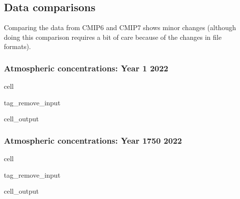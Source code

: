\documentclass[letterpaper,10pt,english]{jupyterBook}
\begin{document}
\subsection{Data comparisons}
\label{\detokenize{user-guide-historical:data-comparisons}}
\sphinxAtStartPar
Comparing the data from CMIP6 and CMIP7 shows minor changes
(although doing this comparison requires a bit of care
because of the changes in file formats).


\subsubsection{Atmospheric concentrations: Year 1 \sphinxhyphen{} 2022}
\label{\detokenize{user-guide-historical:atmospheric-concentrations-year-1-2022}}
\begin{sphinxuseclass}{cell}
\begin{sphinxuseclass}{tag_remove_input}\begin{sphinxVerbatimOutput}

\begin{sphinxuseclass}{cell_output}
\noindent{}

\end{sphinxuseclass}\end{sphinxVerbatimOutput}

\end{sphinxuseclass}
\end{sphinxuseclass}

\subsubsection{Atmospheric concentrations: Year 1750 \sphinxhyphen{} 2022}
\label{\detokenize{user-guide-historical:atmospheric-concentrations-year-1750-2022}}
\begin{sphinxuseclass}{cell}
\begin{sphinxuseclass}{tag_remove_input}\begin{sphinxVerbatimOutput}

\begin{sphinxuseclass}{cell_output}
\noindent{}

\end{sphinxuseclass}\end{sphinxVerbatimOutput}

\end{sphinxuseclass}
\end{sphinxuseclass}
\end{document}
